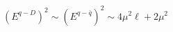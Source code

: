 \begin{equation}      
(E^{q-D})^{2} \sim (E^{q-\bar{q}})^{2} \sim 4 \mu^{2} \ell + 2 \mu^{2}      
\end{equation} 
